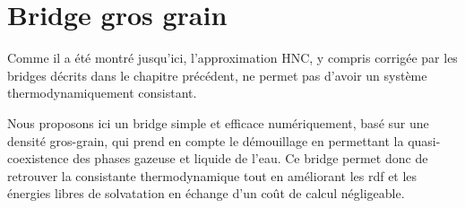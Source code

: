 \chapter{Bridge gros grain}
\label{chap:bridge}




Comme il a été montré jusqu'ici, l'approximation HNC, y compris corrigée par les bridges décrits dans le chapitre précédent, ne permet pas d'avoir un système thermodynamiquement consistant. 


Nous proposons ici un bridge simple et efficace numériquement, basé sur une densité gros-grain, qui prend en compte le démouillage en permettant la quasi-coexistence des phases gazeuse et liquide de l'eau.
Ce bridge permet donc de retrouver la consistante thermodynamique tout en améliorant les rdf et les énergies libres de solvatation en échange d'un coût de calcul négligeable.





